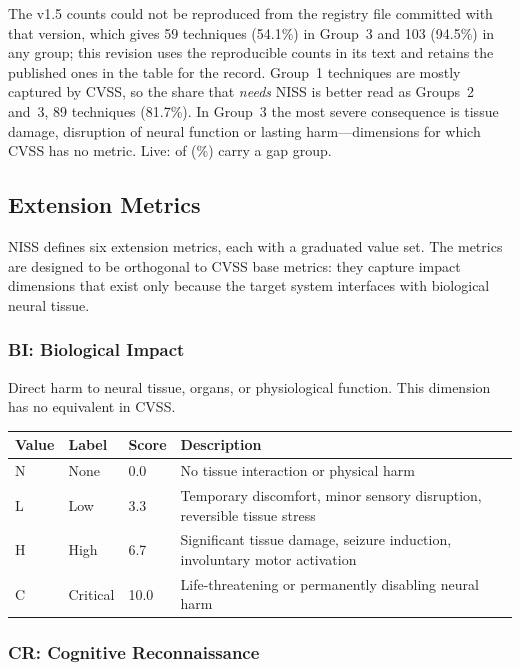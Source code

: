 The v1.5 counts could not be reproduced from the registry file committed with that
version, which gives 59 techniques (54.1\%) in Group~3 and 103 (94.5\%) in any group; this
revision uses the reproducible counts in its text and retains the published ones in the
table for the record. Group~1 techniques are mostly captured by CVSS, so the share that
\emph{needs} NISS is better read as Groups~2 and~3, 89 techniques (81.7\%). In Group~3 the
most severe consequence is tissue damage, disruption of neural function or lasting
harm---dimensions for which CVSS has no metric. Live: \LiveGapTechniques{} of
\LiveTechniques{} (\LiveGapPercent\%) carry a gap group.

\subsection{Extension Metrics}

NISS defines six extension metrics, each with a graduated value set. The
metrics are designed to be orthogonal to CVSS base metrics: they capture impact
dimensions that exist only because the target system interfaces with biological
neural tissue.

\subsubsection{BI: Biological Impact}

Direct harm to neural tissue, organs, or physiological function. This dimension
has no equivalent in CVSS.

\begin{table}[H]
\centering
\small
\begin{tabular}{@{}l l l p{7cm}@{}}
\toprule
\textbf{Value} & \textbf{Label} & \textbf{Score} & \textbf{Description} \\
\midrule
N & None     & 0.0  & No tissue interaction or physical harm \\
L & Low      & 3.3  & Temporary discomfort, minor sensory disruption, reversible tissue stress \\
H & High     & 6.7  & Significant tissue damage, seizure induction, involuntary motor activation \\
C & Critical & 10.0 & Life-threatening or permanently disabling neural harm \\
\bottomrule
\end{tabular}
\end{table}

\subsubsection{CR: Cognitive Reconnaissance}

